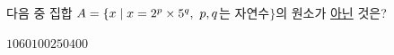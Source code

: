 다음 중 집합 $A=\{x \mid x=2^p\times 5^q,\ p{,}\mkern3mu\mathopen{}q$는 자연수$\}$의 원소가 \underline{아닌} 것은?
\begin{choices32}{$10$}{$60$}{$100$}{$250$}{$400$}\end{choices32}

